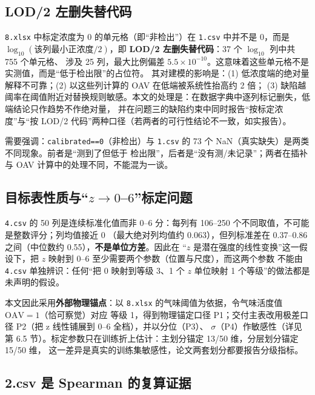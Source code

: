 \documentclass[
  a4paper,12pt]{article}
\begin{document}
\subsection{LOD/2
左删失替代码}\label{lod2-ux5de6ux5220ux5931ux66ffux4ee3ux7801}

\texttt{8.xlsx} 中标定浓度为 0 的单元格（即``非检出''）在 \texttt{1.csv}
中并不是 0，而是 \(\log_{10}(\text{该列最小正浓度}/2)\)，即
\textbf{LOD/2 左删失替代码}：37 个 \(\log_{10}\) 列中共 755 个单元格、
涉及 25 列，最大比例偏差
\(5.5\times10^{-10}\)。这意味着这些单元格不是实测值，而是``低于检出限''的占位符。
其对建模的影响是：(1) 低浓度端的绝对量解释不可靠；(2) 以这些列计算的 OAV
在低端被系统性抬高约 2 倍； (3)
缺陷越阈率在阈值附近对替换规则敏感。本文的处理是：在数据字典中逐列标记删失，低端结论只作趋势不作绝对量，
并在问题三的缺陷约束中同时报告``按标定浓度''与``按 LOD/2
代码''两种口径（若两者的可行性结论不一致，如实报告）。

需要强调：\texttt{calibrated==0}（非检出）与 \texttt{1.csv} 的 73 个
NaN（真实缺失）是两类不同现象。前者是``测到了但低于
检出限''，后者是``没有测/未记录''；两者在插补与 OAV
计算中的处理不同，不能混为一谈。

\subsection{\texorpdfstring{目标表性质与``\(z\to0\)--\(6\)''标定问题}{目标表性质与``z\textbackslash to0--6''标定问题}}\label{ux76eeux6807ux8868ux6027ux8d28ux4e0ezto06ux6807ux5b9aux95eeux9898}

\texttt{4.csv} 的 50 列是连续标准化值而非 0--6 分：每列有 106--250
个不同取值，不可能是整数评分；列均值接近 0 （最大绝对列均值约
0.063），但列标准差在 0.37--0.86 之间（中位数约
0.55），\textbf{不是单位方差}。因此在 ``\(z\)
是潜在强度的线性变换''这一假设下，把 \(z\) 映射到 0--6
至少需要两个参数（位置与尺度），而这两个参数 不能由 \texttt{4.csv}
单独辨识：任何``把 0 映射到等级 3、1 个 \(z\) 单位映射 1
个等级''的做法都是未声明的假设。

本文因此采用\textbf{外部物理锚点}：以 \texttt{8.xlsx}
的气味阈值为依据，令气味活度值 \(\mathrm{OAV}=1\)（恰可察觉）对应 等级
1，得到物理锚定口径 P1；交付主表改用极差口径 P2（把 z 线性铺展到 0--6
全档），并以分位（P3）、 \(\sigma\)（P4）作敏感性（详见第 6.5
节）。标定参数只在训练折上估计：主划分锚定 13/50 维，分层划分锚定 15/50
维， 这一差异是真实的训练集敏感性，论文两套划分都要报告分级指标。

\subsection{2.csv 是 Spearman
的复算证据}\label{csv-ux662f-spearman-ux7684ux590dux7b97ux8bc1ux636e}
\end{document}
